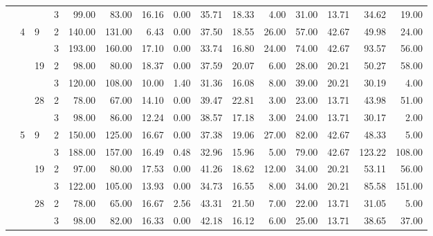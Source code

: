 \begin{tabular}{llllrrrrrrrrrrr}
               &   &    & 3 &    99.00 &     83.00 & 16.16 &    0.00 &   35.71 &   18.33 &    4.00 &   31.00 &   13.71 &  34.62 &    19.00 \\
\cline{2-15}
\cline{3-15}
               & \multirow{6}{*}{4} & \multirow{2}{*}{9} & 2 &   140.00 &    131.00 &  6.43 &    0.00 &   37.50 &   18.55 &   26.00 &   57.00 &   42.67 &  49.98 &    24.00 \\
               &   &    & 3 &   193.00 &    160.00 & 17.10 &    0.00 &   33.74 &   16.80 &   24.00 &   74.00 &   42.67 &  93.57 &    56.00 \\
\cline{3-15}
               &   & \multirow{2}{*}{19} & 2 &    98.00 &     80.00 & 18.37 &    0.00 &   37.59 &   20.07 &    6.00 &   28.00 &   20.21 &  50.27 &    58.00 \\
               &   &    & 3 &   120.00 &    108.00 & 10.00 &    1.40 &   31.36 &   16.08 &    8.00 &   39.00 &   20.21 &  30.19 &     4.00 \\
\cline{3-15}
               &   & \multirow{2}{*}{28} & 2 &    78.00 &     67.00 & 14.10 &    0.00 &   39.47 &   22.81 &    3.00 &   23.00 &   13.71 &  43.98 &    51.00 \\
               &   &    & 3 &    98.00 &     86.00 & 12.24 &    0.00 &   38.57 &   17.18 &    3.00 &   24.00 &   13.71 &  30.17 &     2.00 \\
\cline{2-15}
\cline{3-15}
               & \multirow{6}{*}{5} & \multirow{2}{*}{9} & 2 &   150.00 &    125.00 & 16.67 &    0.00 &   37.38 &   19.06 &   27.00 &   82.00 &   42.67 &  48.33 &     5.00 \\
               &   &    & 3 &   188.00 &    157.00 & 16.49 &    0.48 &   32.96 &   15.96 &    5.00 &   79.00 &   42.67 & 123.22 &   108.00 \\
\cline{3-15}
               &   & \multirow{2}{*}{19} & 2 &    97.00 &     80.00 & 17.53 &    0.00 &   41.26 &   18.62 &   12.00 &   34.00 &   20.21 &  53.11 &    56.00 \\
               &   &    & 3 &   122.00 &    105.00 & 13.93 &    0.00 &   34.73 &   16.55 &    8.00 &   34.00 &   20.21 &  85.58 &   151.00 \\
\cline{3-15}
               &   & \multirow{2}{*}{28} & 2 &    78.00 &     65.00 & 16.67 &    2.56 &   43.31 &   21.50 &    7.00 &   22.00 &   13.71 &  31.05 &     5.00 \\
               &   &    & 3 &    98.00 &     82.00 & 16.33 &    0.00 &   42.18 &   16.12 &    6.00 &   25.00 &   13.71 &  38.65 &    37.00 \\

\end{tabular}
